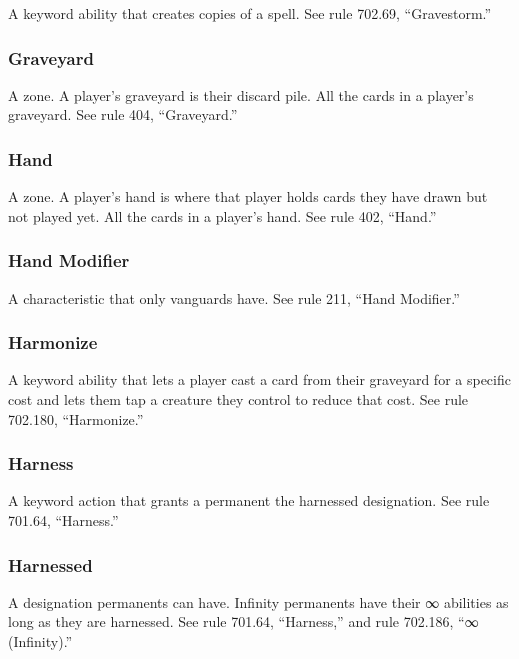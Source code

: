 {{{{{{{{{{{{{{{A keyword ability that creates copies of a spell. See rule 702.69, “Gravestorm.”

\subsubsection*{Graveyard}

A zone. A player’s graveyard is their discard pile.
All the cards in a player’s graveyard.
See rule 404, “Graveyard.”

\subsubsection*{Hand}

A zone. A player’s hand is where that player holds cards they have drawn but not played yet.
All the cards in a player’s hand.
See rule 402, “Hand.”

\subsubsection*{Hand Modifier}

A characteristic that only vanguards have. See rule 211, “Hand Modifier.”

\subsubsection*{Harmonize}

A keyword ability that lets a player cast a card from their graveyard for a specific cost and lets them tap a creature they control to reduce that cost. See rule 702.180, “Harmonize.”

\subsubsection*{Harness}

A keyword action that grants a permanent the harnessed designation. See rule 701.64, “Harness.”

\subsubsection*{Harnessed}

A designation permanents can have. Infinity permanents have their ∞ abilities as long as they are harnessed. See rule 701.64, “Harness,” and rule 702.186, “∞ (Infinity).”

}}}}}}}}}}}}}}}

